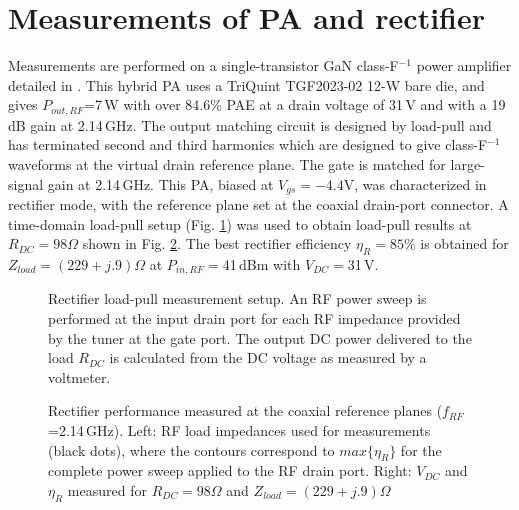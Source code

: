 \documentclass[twocolumn]{el-author}
\begin{document}
\section{Measurements of PA and rectifier}
Measurements are performed on a single-transistor GaN class-F$^{-1}$ power amplifier detailed in \cite{3}. This hybrid PA uses a TriQuint TGF2023-02 12-W bare die, and gives $P_{out,RF}$=7\,W with over 84.6\% PAE at a drain voltage of 31\,V and with a 19\,dB gain at 2.14\,GHz. The output matching circuit is designed by load-pull and has terminated second and third harmonics which are designed to give class-F$^{-1}$ waveforms at the virtual drain reference plane. The gate is matched for large-signal gain at 2.14\,GHz. This PA, biased at $V_{gs}=-4.4$V, was characterized in rectifier mode, with the reference plane set at the coaxial drain-port connector. A time-domain load-pull setup (Fig. \ref{bench}) was used to obtain load-pull results at $R_{DC}=98\Omega$ shown in Fig. \ref{measurements}. The best rectifier efficiency $\eta_{R}=85\%$ is obtained for $Z_{load}=(229+j.9)\Omega$ at $P_{in,RF}=$41\,dBm with $V_{DC}=$31\,V.
%
%
\begin{figure} [h]
\caption{Rectifier load-pull measurement setup. An RF power sweep is performed at the input drain port for each RF impedance provided by the tuner at the gate port. The output DC power delivered to the load $R_{DC}$ is calculated from the DC voltage as measured by a voltmeter. 
\source{}}\label{bench}
\end{figure}
%
%
\begin{figure}[h]
\caption{Rectifier performance measured at the coaxial reference planes ($f_{RF}$=2.14\,GHz). Left: RF load impedances used for measurements (black dots), where the contours correspond to $max\{\eta_R\}$ for the complete power sweep applied to the RF drain port. Right: $V_{DC}$ and $\eta_R$ measured for $R_{DC}=98\Omega$ and $Z_{load}=(229+j.9)\Omega$\source{}}\label{measurements}
\end{figure}
%
%
%
%
%
%
\end{document}
